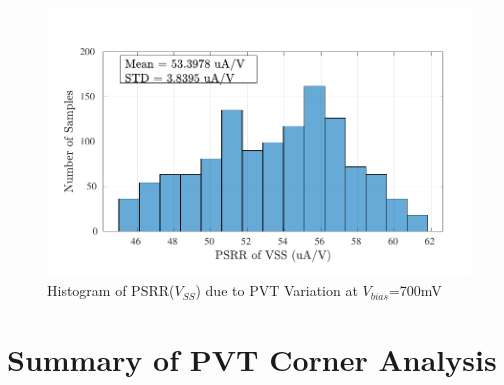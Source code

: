 \begin{figure} [H]
\centering
\includegraphics[scale=1]{Figures/Corners/Overall/PVT_Max/PDFs/PVT_Max_psrrn.pdf}
\caption{Histogram of PSRR($V_{SS}$) due to PVT Variation at $V_{bias}$=700mV}
\end{figure}

\vfill
\clearpage
\section{Summary of PVT Corner Analysis}